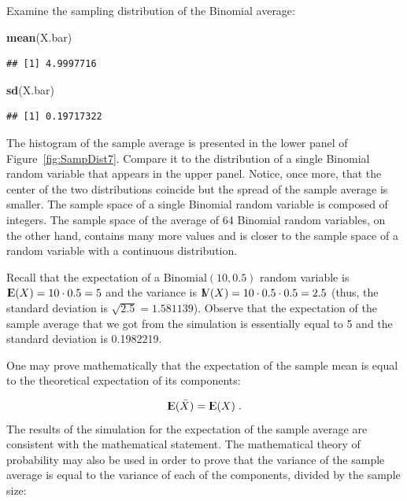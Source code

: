 \documentclass[]{krantz}
\makeatletter
\newenvironment{Shaded}{\begin{snugshade}}{\end{snugshade}}
\newcommand{\KeywordTok}[1]{\textcolor[rgb]{0.13,0.29,0.53}{\textbf{#1}}}
\newcommand{\NormalTok}[1]{#1}
\newcommand{\Expec}{{\rm I\kern-.3em E}}
\newcommand{\Var}{{\rm I\kern-.3em V}}
\newenvironment{kframe}{%
\medskip{}
\setlength{\fboxsep}{.8em}
 \def\at@end@of@kframe{}%
 \ifinner\ifhmode%
  \def\at@end@of@kframe{\end{minipage}}%
  \begin{minipage}{\columnwidth}%
 \fi\fi%
 \def\FrameCommand##1{\hskip\@totalleftmargin \hskip-\fboxsep
 \colorbox{shadecolor}{##1}\hskip-\fboxsep
     \hskip-\linewidth \hskip-\@totalleftmargin \hskip\columnwidth}%
 \MakeFramed {\advance\hsize-\width
   \@totalleftmargin\z@ \linewidth\hsize
   \@setminipage}}%
 {\par\unskip\endMakeFramed%
 \at@end@of@kframe}
\renewenvironment{Shaded}{\begin{kframe}}{\end{kframe}}
\theoremstyle{definition}
\theoremstyle{definition}
\theoremstyle{definition}
\theoremstyle{remark}
\makeatother
\begin{document}
Examine the sampling distribution of the Binomial average:

\begin{Shaded}
\begin{Highlighting}[]
\KeywordTok{mean}\NormalTok{(X.bar)}
\end{Highlighting}
\end{Shaded}

\begin{verbatim}
## [1] 4.9997716
\end{verbatim}

\begin{Shaded}
\begin{Highlighting}[]
\KeywordTok{sd}\NormalTok{(X.bar)}
\end{Highlighting}
\end{Shaded}

\begin{verbatim}
## [1] 0.19717322
\end{verbatim}

The histogram of the sample average is presented in the lower panel of
Figure~\ref{fig:SampDist7}. Compare it to the distribution of a single
Binomial random variable that appears in the upper panel. Notice, once
more, that the center of the two distributions coincide but the spread
of the sample average is smaller. The sample space of a single Binomial
random variable is composed of integers. The sample space of the average
of 64 Binomial random variables, on the other hand, contains many more
values and is closer to the sample space of a random variable with a
continuous distribution.

Recall that the expectation of a \(\mathrm{Binomial}(10,0.5)\) random
variable is \(\Expec(X) = 10 \cdot 0.5 = 5\) and the variance is
\(\Var(X) = 10 \cdot 0.5 \cdot 0.5 = 2.5\) (thus, the standard deviation
is \(\sqrt{2.5} = 1.581139\)). Observe that the expectation of the
sample average that we got from the simulation is essentially equal to 5
and the standard deviation is 0.1982219.

One may prove mathematically that the expectation of the sample mean is
equal to the theoretical expectation of its components:

\[\Expec(\bar X) = \Expec(X)\;.\] The results of the simulation for the
expectation of the sample average are consistent with the mathematical
statement. The mathematical theory of probability may also be used in
order to prove that the variance of the sample average is equal to the
variance of each of the components, divided by the sample size:
\end{document}

